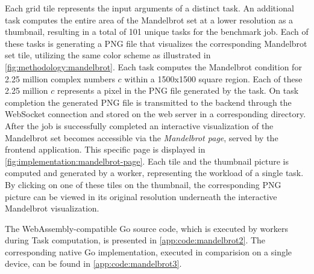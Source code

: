 Each grid tile represents the input arguments of a distinct task. An additional task computes the entire area of the Mandelbrot set at a lower resolution as a thumbnail, resulting in a total of 101 unique tasks for the benchmark job. Each of these tasks is generating a \acs{PNG} file that visualizes the corresponding Mandelbrot set tile, utilizing the same color scheme as illustrated in \autoref{fig:methodology:mandelbrot}. Each task computes the Mandelbrot condition for 2.25 million complex numbers $c$ within a 1500x1500 square region. Each of these 2.25 million $c$ represents a pixel in the \acs{PNG} file generated by the task. On task completion the generated \acs{PNG} file is transmitted to the backend through the WebSocket connection and stored on the web server in a corresponding directory. After the job is successfully completed an interactive visualization of the Mandelbrot set becomes accessible via the \emph{Mandelbrot page}, served by the frontend application. This specific page is displayed in \autoref{fig:implementation:mandelbrot-page}. Each tile and the thumbnail picture is computed and generated by a worker, representing the workload of a single task. By clicking on one of these tiles on the thumbnail, the corresponding \acs{PNG} picture can be viewed in its original resolution underneath the interactive Mandelbrot visualization.

The WebAssembly-compatible Go source code, which is executed by workers during Task computation, is presented in \autoref{app:code:mandelbrot2}. The corresponding native Go implementation, executed in comparision on a single device, can be found in \autoref{app:code:mandelbrot3}.


